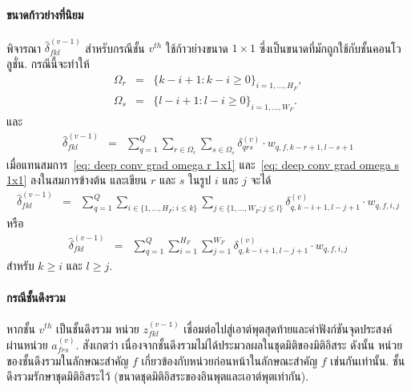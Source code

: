 {\small
	\begin{shaded}
		\paragraph{\small ขนาดก้าวย่างที่นิยม}
		พิจารณา $\hat{\delta}_{fkl}^{(v-1)}$ สำหรับกรณีชั้น $v^{th}$ ใช้ก้าวย่างขนาด $1 \times 1$ ซึ่งเป็นขนาดที่มักถูกใช้กับชั้นคอนโวลูชั่น.
		กรณีนี้จะทำให้
		\begin{eqnarray}
		\Omega_r &=& \{k - i + 1: k - i \geq 0 \}_{i = 1,\ldots,H_F}
		\label{eq: deep conv grad omega r 1x1} , \\
		\Omega_s &=& \{l - i + 1: l - i \geq 0 \}_{i = 1,\ldots,W_F}
		\label{eq: deep conv grad omega s 1x1} .
		\end{eqnarray}
		และ
		\begin{eqnarray}
		\hat{\delta}_{fkl}^{(v-1)}
		&=&
		\sum_{q=1}^Q \sum_{r \in \Omega_r} \sum_{s \in \Omega_s} \delta_{qrs}^{(v)}
		\cdot
		w_{q,f, k - r + 1, l - s + 1}
		\label{eq: deep delta hat stride 1x1}
		\end{eqnarray}
		เมื่อแทนสมการ~\ref{eq: deep conv grad omega r 1x1} และ~\ref{eq: deep conv grad omega s 1x1} ลงในสมการข้างต้น และเขียน $r$ และ $s$ ในรูป $i$ และ $j$ จะได้
		\begin{eqnarray}
		\hat{\delta}_{fkl}^{(v-1)}
		&=&
		\sum_{q=1}^Q 
		\sum_{i \in \{1, \ldots, H_F: i \leq k\}} 
		\sum_{j \in \{1, \ldots, W_F: j \leq l\}} \delta_{q, k - i + 1, l - j + 1}^{(v)}
		\cdot
		w_{q,f, i, j}
		\nonumber
		\end{eqnarray}
		หรือ
		\begin{eqnarray}
		\hat{\delta}_{fkl}^{(v-1)}
		&=&
		\sum_{q=1}^Q 
		\sum_{i = 1}^{H_F} 
		\sum_{j = 1}^{W_F}
		\delta_{q, k - i + 1, l - j + 1}^{(v)}
		\cdot
		w_{q,f, i, j}
		\label{eq: deep delta stride 1x1 clean} 
		\end{eqnarray}
		สำหรับ $k \geq i$  และ $l \geq j$.
	\end{shaded}
}%


\paragraph{กรณีชั้นดึงรวม} หากชั้น $v^{th}$ เป็นชั้นดึงรวม
หน่วย $z_{fkl}^{(v-1)}$ เชื่อมต่อไปสู่เอาต์พุตสุดท้ายและค่าฟังก์ชันจุดประสงค์
ผ่านหน่วย $a_{frs}^{(v)}$.
สังเกตว่า เนื่องจากชั้นดึงรวมไม่ได้ประมวลผลในชุดมิติของมิติอิสระ
ดังนั้น หน่วยของชั้นดึงรวมในลักษณะสำคัญ $f$ เกี่ยวข้องกับหน่วยก่อนหน้าในลักษณะสำคัญ $f$ เช่นกันเท่านั้น.
ชั้นดึงรวมรักษาชุดมิติอิสระไว้ (ขนาดชุดมิติอิสระของอินพุตและเอาต์พุตเท่ากัน).

